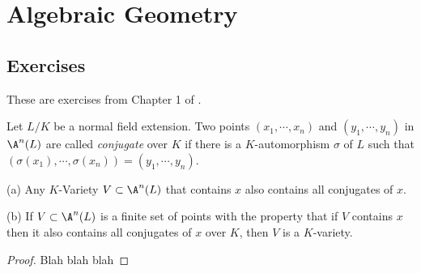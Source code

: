 \documentclass[oneside,12pt]{amsart}
\begin{document}

\section{Algebraic Geometry}


\subsection{Exercises}
These are exercises from Chapter 1 of \cite{Kunz_Book}.

\begin{exercise}
Let $L/K$ be a normal field extension. Two points $(x_1,\cdots,x_n)$ and $(y_1,\cdots,y_n)$ in
$\A^n(L)$ are called \emph{conjugate} over $K$ if there is a $K$-automorphism $\sigma$ of $L$
such that $(\sigma(x_1),\cdots,\sigma(x_n))=(y_1,\cdots,y_n)$.

(a) Any $K$-Variety $V\subset\A^n(L)$ that contains $x$ also contains all conjugates of $x$.

(b) If $V\subset\A^n(L)$ is a finite set of points with the property that if $V$ contains $x$
then it also contains all conjugates of $x$ over $K$, then $V$ is a $K$-variety.
\end{exercise}
\begin{proof}
Blah blah blah
\end{proof}





\end{document}
